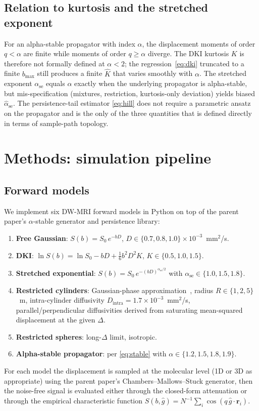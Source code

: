 \documentclass[11pt,letterpaper]{article}
\newcommand{\stab}{\alpha}
\begin{document}
\subsection{Relation to kurtosis and the stretched exponent}
For an alpha-stable propagator with index $\stab$, the
displacement moments of order $q < \stab$ are finite while moments of
order $q \ge \stab$ diverge. The DKI kurtosis $K$ is therefore not
formally defined at $\stab<2$; the regression~\eqref{eq:dki} truncated
to a finite $b_{\max}$ still produces a finite $\widehat{K}$ that
varies smoothly with $\stab$. The stretched exponent
$\stab_{\mathrm{se}}$ equals $\stab$ exactly when the underlying
propagator is alpha-stable, but mis-specification (mixtures,
restriction, kurtosis-only deviation) yields biased
$\widehat{\stab}_{\mathrm{se}}$. The persistence-tail estimator
\eqref{eq:hill} does not require a parametric ansatz on the propagator
and is the only of the three quantities that is defined directly in
terms of sample-path topology.

\section{Methods: simulation pipeline}\label{sec:methods}

\subsection{Forward models}
We implement six DW-MRI forward models in Python on top of the parent
paper's $\stab$-stable generator and persistence library:

\begin{enumerate}
\item \textbf{Free Gaussian}: $S(b) = S_0\,e^{-bD}$,
$D\in\{0.7,0.8,1.0\}\times 10^{-3}$~mm$^2$/s.
\item \textbf{DKI}: $\ln S(b) = \ln S_0 - bD + \tfrac{1}{6}b^2 D^2 K$,
$K\in\{0.5, 1.0, 1.5\}$.
\item \textbf{Stretched exponential}: $S(b) = S_0\,e^{-(bD)^{\stab_{\mathrm{se}}/2}}$
with $\stab_{\mathrm{se}}\in\{1.0, 1.5, 1.8\}$.
\item \textbf{Restricted cylinders}: Gaussian-phase
approximation~\citep{stepisnik1993}, radius
$R\in\{1,2,5\}$~\textmu m, intra-cylinder diffusivity
$D_{\mathrm{intra}}=1.7\times 10^{-3}$~mm$^2$/s,
parallel/perpendicular diffusivities derived from saturating
mean-squared displacement at the given $\Delta$.
\item \textbf{Restricted spheres}: long-$\Delta$ limit, isotropic.
\item \textbf{Alpha-stable propagator}: per
\eqref{eq:stable} with $\stab\in\{1.2, 1.5, 1.8, 1.9\}$.
\end{enumerate}
For each model the displacement is sampled at the molecular level (1D
or 3D as appropriate) using the parent paper's
Chambers--Mallows--Stuck generator, then the noise-free signal is
evaluated either through the closed-form attenuation or through the
empirical characteristic function
$\widehat{S}(b,\hat g) = N^{-1}\sum_i \cos(q\,\hat g\cdot\mathbf{r}_i)$.
\end{document}
